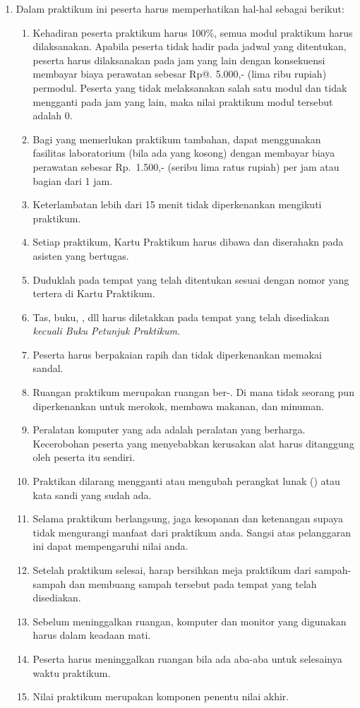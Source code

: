 \documentclass[../main.tex]{subfiles}
\begin{document}
\begin{enumerate}
\item Dalam praktikum ini peserta harus memperhatikan hal-hal sebagai berikut:
  \begin{enumerate}
  \item Kehadiran peserta praktikum harus 100\%, semua modul praktikum harus
  dilaksanakan. Apabila peserta tidak hadir pada jadwal yang ditentukan, peserta
  harus dilaksanakan pada jam yang lain dengan konsekuensi membayar biaya
  perawatan sebesar Rp@. 5.000,- (lima ribu rupiah) permodul. Peserta yang tidak
  melaksanakan salah satu modul dan tidak mengganti pada jam yang lain, maka
  nilai praktikum modul tersebut adalah 0.
  \item Bagi yang memerlukan praktikum tambahan, dapat menggunakan fasilitas
  laboratorium (bila ada yang kosong) dengan membayar biaya perawatan sebesar
  Rp.\ 1.500,- (seribu lima ratus rupiah) per jam atau bagian dari 1 jam.
  \item Keterlambatan lebih dari 15 menit tidak diperkenankan mengikuti praktikum.
  \item Setiap praktikum, Kartu Praktikum harus dibawa dan diserahakn pada
  asisten yang bertugas.
  \item Duduklah pada tempat yang telah ditentukan sesuai dengan nomor yang
  tertera di Kartu Praktikum.
  \item Tas, buku, , dll harus diletakkan pada tempat yang telah
  disediakan \emph{kecuali Buku Petunjuk Praktikum}.
  \item Peserta harus berpakaian rapih dan tidak diperkenankan memakai sandal.
  \item Ruangan praktikum merupakan ruangan ber-. Di mana tidak seorang
  pun diperkenankan untuk merokok, membawa makanan, dan minuman.
  \item Peralatan komputer yang ada adalah peralatan yang berharga. Kecerobohan
  peserta yang menyebabkan kerusakan alat harus ditanggung oleh peserta itu sendiri.
  \item Praktikan dilarang mengganti atau mengubah perangkat lunak
  () atau kata sandi yang sudah ada.
  \item Selama praktikum berlangsung, jaga kesopanan dan ketenangan supaya tidak
  mengurangi manfaat dari praktikum anda. Sangsi atas pelanggaran ini dapat
  mempengaruhi nilai anda.
  \item Setelah praktikum selesai, harap bersihkan meja praktikum dari
  sampah-sampah dan membuang sampah tersebut pada tempat yang telah disediakan.
  \item Sebelum meninggalkan ruangan, komputer dan monitor yang digunakan harus
  dalam keadaan mati.
  \item Peserta harus meninggalkan ruangan bila ada aba-aba untuk selesainya
  waktu praktikum.
  \item Nilai praktikum merupakan komponen penentu nilai akhir.
  \end{enumerate}
\end{enumerate}
\end{document}
